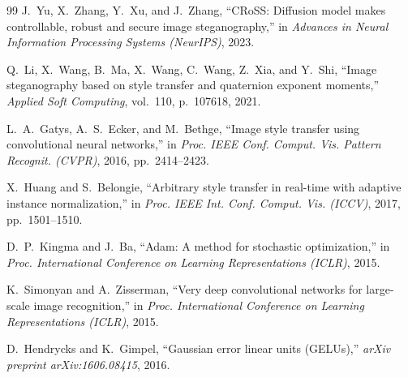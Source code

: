 \documentclass[conference]{IEEEtran}
\begin{document}
\begin{thebibliography}{99}
J.\ Yu, X.\ Zhang, Y.\ Xu, and J.\ Zhang, ``CRoSS: Diffusion model makes controllable, robust and secure image steganography,'' in \emph{Advances in Neural Information Processing Systems (NeurIPS)}, 2023.

Q.\ Li, X.\ Wang, B.\ Ma, X.\ Wang, C.\ Wang, Z.\ Xia, and Y.\ Shi, ``Image steganography based on style transfer and quaternion exponent moments,'' \emph{Applied Soft Computing}, vol.\ 110, p.\ 107618, 2021.

L.~A.\ Gatys, A.~S.\ Ecker, and M.\ Bethge, ``Image style transfer using convolutional neural networks,'' in \emph{Proc. IEEE Conf. Comput. Vis. Pattern Recognit. (CVPR)}, 2016, pp.\ 2414--2423.

X.\ Huang and S.\ Belongie, ``Arbitrary style transfer in real-time with adaptive instance normalization,'' in \emph{Proc. IEEE Int. Conf. Comput. Vis. (ICCV)}, 2017, pp.\ 1501--1510.

D.~P.\ Kingma and J.\ Ba, ``Adam: A method for stochastic optimization,'' in \emph{Proc. International Conference on Learning Representations (ICLR)}, 2015.

K.\ Simonyan and A.\ Zisserman, ``Very deep convolutional networks for large-scale image recognition,'' in \emph{Proc. International Conference on Learning Representations (ICLR)}, 2015.

D.\ Hendrycks and K.\ Gimpel, ``Gaussian error linear units (GELUs),'' \emph{arXiv preprint arXiv:1606.08415}, 2016.

\end{thebibliography}
\end{document}
